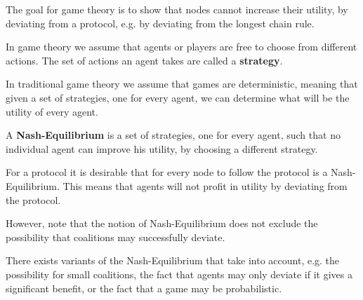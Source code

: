 The goal for game theory is to show that nodes cannot increase their utility, by deviating from a protocol, e.g. by deviating from the longest chain rule.

\begin{definition}
In game theory we assume that agents or players are free to choose from different actions. The set of actions an agent takes are called a \textbf{strategy}.
\end{definition}

In traditional game theory we assume that games are deterministic, meaning that given a set of strategies, one for every agent, we can determine what will be the utility of every agent.

\begin{definition}
	A \textbf{Nash-Equilibrium} is a set of strategies, one for every agent, such that no individual agent can improve his utility, by choosing a different strategy.
\end{definition}

For a protocol it is desirable that for every node to follow the protocol is a Nash-Equilibrium. This means that agents will not profit in utility by deviating from the protocol.

However, note that the notion of Nash-Equilibrium does not exclude the possibility that coalitions may successfully deviate.

\begin{note}
There exists variants of the Nash-Equilibrium that take into account, e.g. the possibility for small coalitions, the fact that agents may only deviate if it gives a significant benefit, or the fact that a game may be probabilistic.
\end{note}